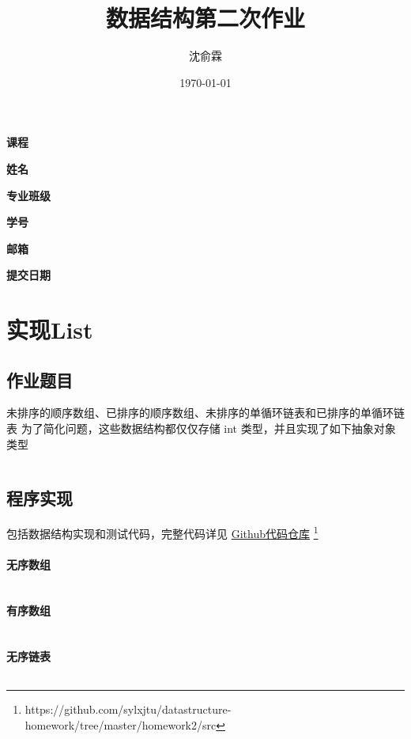 \documentclass[UTF8]{ctexart}
\title{数据结构第二次作业}
\date{\today}
\author{沈俞霖}
\begin{document}
  \maketitle
  \vspace{100mm}
  \begin{flushright}
  \textbf{课程} 

  \textbf{姓名} 

  \textbf{专业班级} 

  \textbf{学号} 

  \textbf{邮箱} 

  \textbf{提交日期} \makebox[7em][l]{\today}
  \end{flushright}
  \newpage

  \tableofcontents
  \newpage

  \section{实现List}
    \subsection{作业题目}
      未排序的顺序数组、已排序的顺序数组、未排序的单循环链表和已排序的单循环链表
      为了简化问题，这些数据结构都仅仅存储 int 类型，并且实现了如下抽象对象类型
      \inputminted{java}{src/sylxjtu/ListInterface.java}
    \subsection{程序实现}
    包括数据结构实现和测试代码，完整代码详见
      \href{https://github.com/sylxjtu/datastructure-homework/tree/master/homework2/src}{Github代码仓库}
      \footnote{https://github.com/sylxjtu/datastructure-homework/tree/master/homework2/src}
      \paragraph{无序数组}
      \inputminted{java}{src/sylxjtu/UnsortedArray.java}
      \paragraph{有序数组}
      \inputminted{java}{src/sylxjtu/SortedArray.java}
      \paragraph{无序链表}
      \inputminted{java}{src/sylxjtu/UnsortedLinkedList.java}
\end{document}
